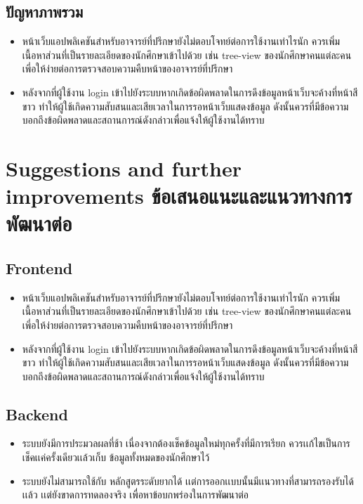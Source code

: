 \subsection{ปัญหาภาพรวม}
\begin{itemize}
    \item  หน้าเว็บแอปพลิเคชันสำหรับอาจารย์ที่ปรึกษายังไม่ตอบโจทย์ต่อการใช้งานเท่าไรนัก 
    ควรเพิ่มเนื้อหาส่วนที่เป็นรายละเอียดของนักศึกษาเข้าไปด้วย เช่น tree-view 
    ของนักศึกษาคนแต่ละคนเพี่อให้ง่ายต่อการตรวจสอบความคืบหน้าของอาจารย์ที่ปรึกษา
    \item หลังจากที่ผู้ใช้งาน login เข้าไปยังระบบหากเกิดข้อผิดพลาดในการดึงข้อมูลหน้าเว็บจะค้างที่หน้าสีขาว 
    ทำให้ผู้ใช้เกิดความสับสนและเสียเวลาในการรอหน้าเว็บแสดงข้อมูล ดังนั้นควรที่มีข้อความบอกถึงข้อผิดพลาดและสถานการณ์ดังกล่าวเพื่อแจ้งให้ผู้ใช้งานได้ทราบ
	
\end{itemize}


\section{\ifenglish%
Suggestions and further improvements
\else%
ข้อเสนอแนะและแนวทางการพัฒนาต่อ
\fi
}
\subsection{Frontend}
\begin{itemize}
    \item  หน้าเว็บแอปพลิเคชันสำหรับอาจารย์ที่ปรึกษายังไม่ตอบโจทย์ต่อการใช้งานเท่าไรนัก 
    ควรเพิ่มเนื้อหาส่วนที่เป็นรายละเอียดของนักศึกษาเข้าไปด้วย เช่น tree-view 
    ของนักศึกษาคนแต่ละคนเพี่อให้ง่ายต่อการตรวจสอบความคืบหน้าของอาจารย์ที่ปรึกษา
    \item หลังจากที่ผู้ใช้งาน login เข้าไปยังระบบหากเกิดข้อผิดพลาดในการดึงข้อมูลหน้าเว็บจะค้างที่หน้าสีขาว 
    ทำให้ผู้ใช้เกิดความสับสนและเสียเวลาในการรอหน้าเว็บแสดงข้อมูล ดังนั้นควรที่มีข้อความบอกถึงข้อผิดพลาดและสถานการณ์ดังกล่าวเพื่อแจ้งให้ผู้ใช้งานได้ทราบ
	
\end{itemize}

\subsection{Backend}
\begin{itemize}
    \item ระบบยังมีการประมวลผลที่ช้า เนื่องจากต้องเช็คข้อมูลใหม่ทุกครั้งที่มีการเรียก ควรเเก้ไขเป็นการเช็คเเค่ครั้งเดียวเเล้วเก็บ ข้อมูลทั้งหมดของนักศึกษาไว้
    \item ระบบยังไม่สามารถใช้กับ หลักสูตรระดับยากได้ เเต่การออกเเบบนั้นมีเเนวทางที่สามารถรองรับได้เเล้ว เเต่ยังขาดการทดลองจริง เพื่อหาข้อบกพร่องในการพัฒนาต่อ
	
\end{itemize}


